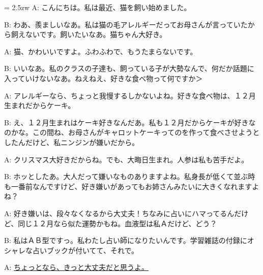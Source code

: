 \documentclass[11pt]{amsart}
\title{}
\author{}
\newenvironment{hangall}[1]{\hangindent = 2.5zw\everypar{\hangindent = 2.5zw}}{}
\begin{document}
\maketitle
\begin{hangall}{}%
A: こんにちは。私は最近、猫を飼い始めました。

B: わあ、羨ましいなあ。私は猫の毛アレルギーだってお母さんが言っていたから飼えないです。飼いたいなあ。猫ちゃん大好き。

A: 猫、かわいいですよ。ふわふわで、もうたまらないです。

B: いいなあ。私のクラスの子達も、飼っている子が大勢なんで、何だか話題に入っていけないなあ。ねえねえ、好きな食べ物って何ですか＞

A: アレルギーなら、ちょっと我慢するしかないよね。好きな食べ物は、１２月生まれだからケーキ。

B: え、１２月生まれはケーキ好きなんだあ。私も１２月だからケーキが好きなのかな。この間ね、お母さんがキャロットケーキってのを作って食べさせようとしたんだけど、私ニンジンが嫌いだから。

A: クリスマス大好きだからね。でも、大晦日生まれ。人参は私も苦手だよ。

B: ホッとしたあ。大人だって嫌いなものありますよね。私身長が低くて並ぶ時も一番前なんですけど、好き嫌いがあってもお姉さんみたいに大きくなれますよね？

A: 好き嫌いは、段々なくなるから大丈夫！ちなみに占いにハマってるんだけど、同じ１２月なら似た運勢かもね。血液型は私Ａだけど、どう？

B: 私はＡＢ型ですっ。私わたし占い師になりたいんです。学習雑誌の付録にオシャレな占いブックが付いてて、それで。

A: \ul{ちょっとなら、きっと大丈夫だと思うよ。}\end{hangall}
\end{document}
